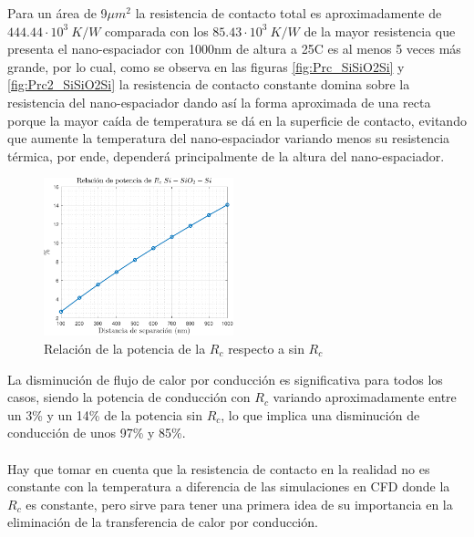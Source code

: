 Para un área de 9$\mu m^2$ la resistencia de contacto total es aproximadamente de $444.44\cdot 10^3 \ K/W$ comparada con los $85.43\cdot 10^3 \ K/W$ de la mayor resistencia que presenta el nano-espaciador con 1000nm de altura a 25\textdegree C es al menos 5 veces más grande, por lo cual, como se observa en las figuras \ref{fig:Prc_SiSiO2Si} y \ref{fig:Prc2_SiSiO2Si} la resistencia de contacto constante domina sobre la resistencia del nano-espaciador dando así la forma aproximada de una recta porque la mayor caída de temperatura se dá en la superficie de contacto, evitando que aumente la temperatura del nano-espaciador variando menos su resistencia térmica, por ende, dependerá principalmente de la altura del nano-espaciador.
\begin{figure}[H]
	\centering
		\includegraphics[width=0.49\textwidth]{figuras/Resultados/conduccion/pdf/relPrc_SiSiO2Si.pdf}
		\caption{Relación de la potencia de la $R_c$ respecto a sin $R_c$}
	\label{fig:relPrc_SiSiO2Si}
\end{figure}
La disminución de flujo de calor por conducción es significativa para todos los casos, siendo la potencia de conducción con $R_c$ variando aproximadamente entre un 3\% y un 14\% de la potencia sin $R_c$, lo que implica una disminución de conducción de unos 97\% y 85\%.\\\\
Hay que tomar en cuenta que la resistencia de contacto en la realidad no es constante con la temperatura a diferencia de las simulaciones en CFD donde la $R_c$ es constante, pero sirve para tener una primera idea de su importancia en la eliminación de la transferencia de calor por conducción.
